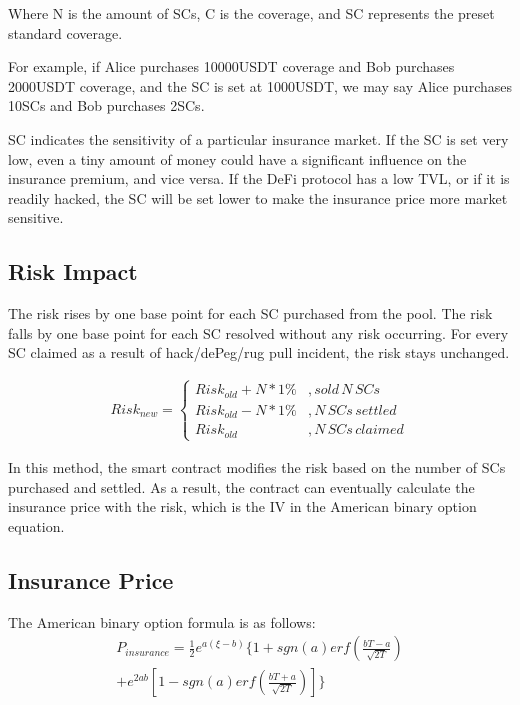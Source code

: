 Where N is the amount of SCs, C is the coverage, and SC represents the preset standard coverage.

For example, if Alice purchases 10000USDT coverage and Bob purchases 2000USDT coverage, and the SC is set at 1000USDT, we may say Alice purchases 10SCs and Bob purchases 2SCs.

SC indicates the sensitivity of a particular insurance market.
If the SC is set very low, even a tiny amount of money could have a significant influence on the insurance premium, and vice versa.
If the DeFi protocol has a low TVL, or if it is readily hacked, the SC will be set lower to make the insurance price more market sensitive.

\subsection{Risk Impact}\label{subsec:risk-impact}

The risk rises by one base point for each SC purchased from the pool.
The risk falls by one base point for each SC resolved without any risk occurring.
For every SC claimed as a result of hack/dePeg/rug pull incident, the risk stays unchanged.

\begin{align} Risk_{new} = \left\{
\begin{aligned}
Risk_{old} + N * 1\%&, {sold\,N\,SCs}\\
Risk_{old} - N * 1\%&, {N\,SCs\,settled} \\
Risk_{old} &, {N\,SCs\,claimed}
\end{aligned}\right.
\end{align}

In this method, the smart contract modifies the risk based on the number of SCs purchased and settled.
As a result, the contract can eventually calculate the insurance price with the risk, which is the IV in the American binary option equation.

\subsection{Insurance Price}\label{subsec:insurance-price}
The American binary option formula is as follows:
\begin{equation}
	\begin{split}
	     P_{insurance} =
			\frac{1}{2}e^{a(\xi-b)}\{1+sgn(a){erf}\left(\frac{bT-a}{\sqrt {2T}}\right) \\
	+ e^{2ab}[1-sgn(a){erf}(\frac{bT+a}{\sqrt {2T}})] \}
	\end{split}\label{eq:American binary option}
\end{equation}

